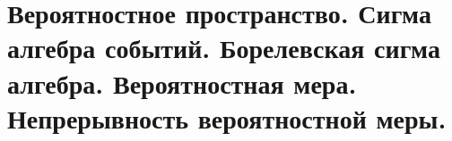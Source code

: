 \section{Вероятностное пространство. Сигма алгебра событий. Борелевская сигма алгебра. Вероятностная мера. Непрерывность вероятностной меры.}
